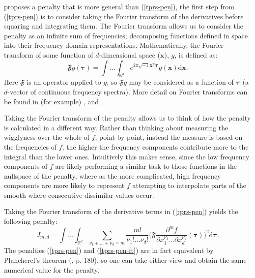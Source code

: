 \cite{duchon77} proposes a penalty that is more general than (\ref{tprs-pen}), the first step from (\ref{tprs-pen}) is to consider taking the Fourier transform of the derivatives before squaring and integrating them. The Fourier transform allows us to consider the penalty as an infinite sum of frequencies; decomposing functions defined in space into their frequency domain representations. Mathematically, the Fourier transform of some function of $d$-dimensional space ($\mathbf{x}$), $g$, is defined as:
\begin{equation*}
\mathfrak{F} g(\boldsymbol{\tau}) = \int \ldots \int_{\mathbb{R}^d} e^{2 \pi \sqrt{-1} \mathbf{x}^\text{T} \boldsymbol{\tau}} g(\mathbf{x}) \text{d}\mathbf{x}.
\end{equation*}
Here $\mathfrak{F}$ is an operator applied to $g$, so $\mathfrak{F}g$ may be considered as a function of $\boldsymbol{\tau}$ (a $d$-vector of continuous frequency spectra). More detail on Fourier transforms can be found in (for example) \cite{bracewell}, \cite{chu-ft} and \cite{beerends}. 

Taking the Fourier transform of the penalty allows us to think of how the penalty is calculated in a different way. Rather than thinking about measuring the wigglyness over the whole of $f$, point by point, instead the measure is based on the frequencies of $f$, the higher the frequency components contribute more to the integral than the lower ones. Intuitively this makes sense, since the low frequency components of $f$ are likely performing a similar task to those functions in the nullspace of the penalty, where as the more complicated, high frequency components are more likely to represent $f$ attempting to interpolate parts of the smooth where consecutive dissimilar values occur.

Taking the Fourier transform of the derivative terms in (\ref{tprs-pen}) yields the following penalty:
\begin{equation}
J_{m,d} = \int \ldots \int_{\mathbb{R}^d} \sum_{\nu_1 + \dots + \nu_d=m} \frac{m!}{\nu_1! \dots \nu_d!}\Big( \mathfrak{F} \frac{\partial^m f}{\partial x_1^{\nu_1} \ldots  \partial x_d^{\nu_d}}(\boldsymbol{\tau}) \Big)^2 \text{d} \boldsymbol{\tau}.
\label{tprs-pen-ft}
\end{equation}
The penalties (\ref{tprs-pen}) and (\ref{tprs-pen-ft}) are in fact equivalent by Plancherel's theorem (\cite{vretblad}, p. 180), so one can take either view and obtain the same numerical value for the penalty. 

